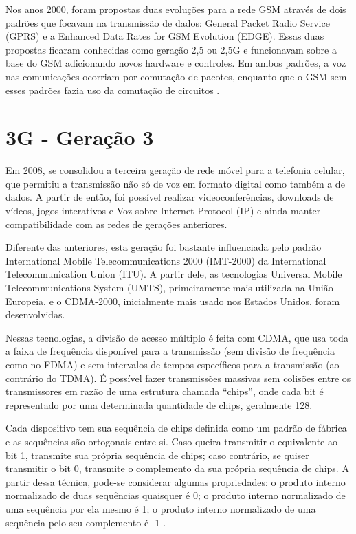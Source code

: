\documentclass[11pt,oneside,a4paper]{abntex2}
\begin{document}
Nos anos 2000, foram propostas duas evoluções para a rede GSM através de dois padrões que focavam na transmissão de dados: General Packet Radio Service (GPRS) e a Enhanced Data Rates for GSM Evolution (EDGE). Essas duas propostas ficaram conhecidas como geração 2,5 ou 2,5G e funcionavam sobre a base do GSM adicionando novos hardware e controles. Em ambos padrões, a voz nas comunicações ocorriam por comutação de pacotes, enquanto que o GSM sem esses padrões fazia uso da comutação de circuitos \cite{tcc2}.

\section*{3G - Geração 3}
\label{3g}

Em 2008, se consolidou a terceira geração de rede móvel para a telefonia celular, que permitiu a transmissão não só de voz em formato digital como também a de dados. A partir de então, foi possível realizar videoconferências, downloads de vídeos, jogos interativos e Voz sobre Internet Protocol (IP) \cite{tcc1} e ainda manter compatibilidade com as redes de gerações anteriores.

Diferente das anteriores, esta geração foi bastante influenciada pelo padrão International Mobile Telecommunications 2000 (IMT-2000) da International Telecommunication Union (ITU). A partir dele, as tecnologias Universal Mobile Telecommunications System (UMTS), primeiramente mais utilizada na União Europeia, e o CDMA-2000, inicialmente mais usado nos Estados Unidos, foram desenvolvidas.

Nessas tecnologias, a divisão de acesso múltiplo é feita com CDMA, que usa toda a faixa de frequência disponível para a transmissão (sem divisão de frequência como no FDMA) e sem intervalos de tempos específicos para a transmissão (ao contrário do TDMA). É possível fazer transmissões massivas sem colisões entre os transmissores em razão de  uma estrutura chamada ``chips'', onde cada bit é representado por uma determinada quantidade de chips, geralmente 128.

Cada dispositivo tem sua sequência de chips definida como um padrão de fábrica e as sequências são ortogonais entre si. Caso queira transmitir o equivalente ao bit 1, transmite sua própria sequência de chips; caso contrário, se quiser transmitir o bit 0, transmite o complemento da sua própria sequência de chips. A partir dessa técnica, pode-se considerar algumas propriedades: o produto interno normalizado de duas sequências quaisquer é 0; o produto interno normalizado de uma sequência por ela mesmo é 1; o produto interno normalizado de uma sequência pelo seu complemento é -1 \cite{aula4}.
\end{document}
